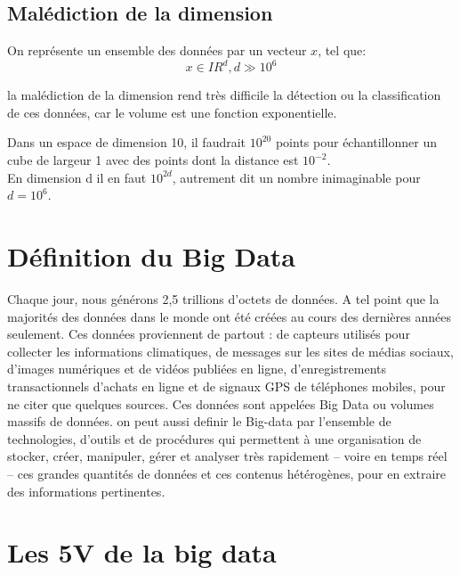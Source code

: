 \documentclass[11pt,twoside,openany,x11names,svgnames]{memoir}
\begin{document}
				\subsection{Malédiction de la dimension}
				
				\normalsize On représente un ensemble des données par un vecteur $x$, tel que: \[x \in {I\!R^d},d \gg {10^6}\]
				
				
				\normalsize la malédiction de la dimension rend très difficile la détection ou la classification de ces données, car le volume est une fonction exponentielle. 
				
				Dans un espace de dimension 10, il faudrait $10^{20}$ points pour échantillonner un cube de largeur 1 avec des points dont la distance est $10^{-2}$.\\
		
		En dimension d il en faut $10^{2d}$, autrement dit un nombre inimaginable pour $d=10^{6}$.
		
		\section{Définition du Big Data}
		
		\normalsize Chaque jour, nous générons 2,5 trillions d’octets de données. A tel point que
	la majorités des données dans le monde ont été créées au cours des dernières années seulement. Ces données proviennent de partout : de capteurs utilisés pour collecter les informations climatiques, de messages sur les sites de médias sociaux, d'images numériques et de vidéos publiées en ligne, d'enregistrements transactionnels d'achats en ligne et de signaux GPS de téléphones mobiles, pour ne citer que quelques sources. Ces données sont appelées Big Data ou volumes massifs de données.
	on peut aussi definir le Big-data par l'ensemble de technologies, d’outils et de procédures qui permettent à une organisation de stocker, créer, manipuler, gérer et analyser très rapidement – voire en temps réel – ces grandes quantités de données et ces contenus hétérogènes, pour en extraire des informations pertinentes. 
		
		
		\section{Les 5V de la big data }
\end{document}
